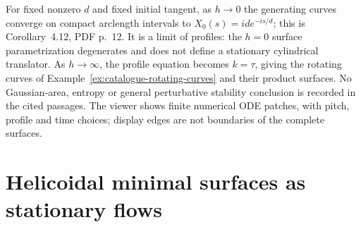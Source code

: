 \begin{example}
For fixed nonzero $d$ and fixed initial tangent, as $h\to0$ the generating
curves converge on compact arclength intervals to
$X_0(s)=id e^{-is/d}$; this is Corollary~4.12, PDF p.~12. It is a limit of
profiles: the $h=0$ surface parametrization degenerates and does not define
a stationary cylindrical translator. As $h\to\infty$, the profile equation
becomes $k=\tau$, giving the rotating curves of
Example~\ref{ex:catalogue-rotating-curves} and their product surfaces.
No Gaussian-area, entropy or general perturbative stability conclusion is
recorded in the cited passages. The viewer shows finite numerical ODE
patches, with pitch, profile and time choices; display edges are not boundaries
of the complete surfaces.
\end{example}

\chapter{Helicoidal minimal surfaces as stationary flows}\label{sec:catalogue-halldorsson-minimal-helicoids}
